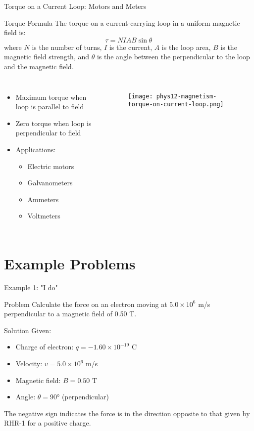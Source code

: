 \documentclass{beamer}
\begin{document}
\begin{frame}{Torque on a Current Loop: Motors and Meters}
\begin{block}{Torque Formula}
The torque on a current-carrying loop in a uniform magnetic field is:
\begin{equation}
\tau = NIAB\sin\theta
\end{equation}
where $N$ is the number of turns, $I$ is the current, $A$ is the loop area, $B$ is the magnetic field strength, and $\theta$ is the angle between the perpendicular to the loop and the magnetic field.
\end{block}

\begin{columns}
\begin{itemize}
\item Maximum torque when loop is parallel to field
\item Zero torque when loop is perpendicular to field
\item Applications:
  \begin{itemize}
  \item Electric motors
  \item Galvanometers
  \item Ammeters
  \item Voltmeters
  \end{itemize}
\end{itemize}

\begin{figure}
    \centering
    \texttt{[image: phys12-magnetism-torque-on-current-loop.png]}
\end{figure}
\end{columns}
\end{frame}

\section{Example Problems}

\begin{frame}{Example 1: "I do"}
\begin{block}{Problem}
Calculate the force on an electron moving at $5.0 \times 10^6$ m/s perpendicular to a magnetic field of 0.50 T.
\end{block}
\pause
\begin{block}{Solution}
Given:
\begin{itemize}
\item Charge of electron: $q = -1.60 \times 10^{-19}$ C
\item Velocity: $v = 5.0 \times 10^6$ m/s
\item Magnetic field: $B = 0.50$ T
\item Angle: $\theta = 90°$ (perpendicular)
\end{itemize}

The negative sign indicates the force is in the direction opposite to that given by RHR-1 for a positive charge.
\end{block}
\end{frame}
\end{document}
